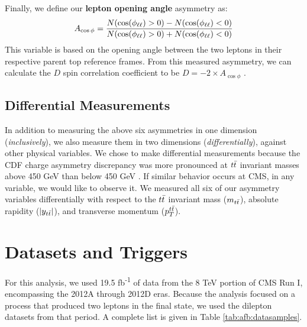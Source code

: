 Finally, we define our \textbf{lepton opening angle} asymmetry as:
\begin{equation}
A_{\cos\phi} = \frac{N(\cos(\phi_{\ell\ell})>0) - N(\cos(\phi_{\ell\ell})<0)}{N(\cos(\phi_{\ell\ell})>0) + N(\cos(\phi_{\ell\ell})<0)}
\end{equation}
This variable is based on the opening angle between the two leptons in
their respective parent top reference frames. From this measured
asymmetry, we can calculate the $D$ spin correlation coefficient to be
$D = -2 \times A_{\cos\phi}$ \cite{spincorrpolcoeff}.

\subsection{Differential Measurements}
\label{ssec:afb:varsdifferential}

In addition to measuring the above six asymmetries in one dimension
(\emph{inclusively}), we also measure them in two dimensions
(\emph{differentially}), against other physical variables.
We chose to make differential measurements because the CDF charge asymmetry
discrepancy was more pronounced at $t\bar{t}$ invariant masses above 450
GeV than below 450 GeV \cite{cdfchargeasym1}. If similar behavior
occurs at CMS, in any variable, we would like to observe it. We
measured all six of our asymmetry variables differentially with
respect to the $t\bar{t}$ invariant mass ($m_{t\bar{t}}$), absolute
rapidity ($|y_{t\bar{t}}|$), and transverse momentum ($p_T^{t\bar{t}}$).

\section{Datasets and Triggers}
\label{sec:afb:datatrig}

For this analysis, we used 19.5 fb\textsuperscript{-1} of data from
the 8 TeV portion of CMS Run I, encompassing the 2012A through 2012D
eras. Because the analysis focused on a process that produced two
leptons in the final state, we used the dilepton datasets from that
period. A complete list is given in Table \ref{tab:afb:datasamples}.


